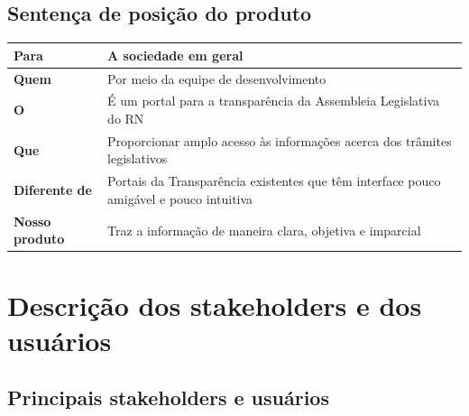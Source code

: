 \documentclass[12pt, a4paper]{article}
\begin{document}
        \subsection{Sentença de posição do produto}
            \begin{longtabu}{X[-1] | X}
                \hline
                \textbf{Para} &
                A sociedade em geral
                \\ \hline

                \textbf{Quem} &
                Por meio da equipe de desenvolvimento
                \\ \hline

                \textbf{O} &
                É um portal para a transparência da Assembleia Legislativa do RN
                \\ \hline

                \textbf{Que} &
                Proporcionar amplo acesso às informações acerca dos trâmites
                legislativos
                \\ \hline

                \textbf{Diferente de} &
                Portais da Transparência existentes que têm interface pouco
                amigável e pouco intuitiva
                \\ \hline

                \textbf{Nosso produto} &
                Traz a informação de maneira clara, objetiva e imparcial
                \\ \hline
            \end{longtabu}

    \section{Descrição dos stakeholders e dos usuários}
        \subsection{Principais stakeholders e usuários}
\end{document}
